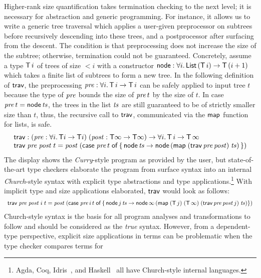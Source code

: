 \documentclass[acmsmall%
]{acmart}\settopmatter{printfolios=true}
\begin{document}
Higher-rank size quantification takes termination checking to the next
level; it is necessary for abstraction and generic programming.  For
instance, it allows us to write a generic tree traversal which applies
a user-given preprocessor on subtrees before recursively descending
into these trees, and a postprocessor after surfacing from the
descent.
The condition is that preprocessing does not increase the size of the subtree; otherwise, termination could not be guaranteed.  Concretely, assume a type $\mathsf{T}\,i$ of trees of size $< i$ with a constructor $\mathsf{node} : \forall i.\, \mathsf{List}\,(\mathsf{T}\,i) \to \mathsf{T}\,(i+1)$ which takes a finite list of subtrees to form a new tree.
In the following definition of $\mathsf{trav}$, the preprocessing $\mathit{pre} : \forall i.\, \mathsf{T}\,i \to \mathsf{T}\,i$ can be safely applied to input tree $t$ because the type of $\mathit{pre}$ bounds the size of $\mathit{pre}\,t$ by the size of $t$.
In case $\mathit{pre}\,t = \mathsf{node}\,\mathit{ts}$, the trees in the list $\mathit{ts}$ are still guaranteed to be of strictly smaller size than $t$, thus, the recursive call to $\mathsf{trav}$, communicated via the $\mathsf{map}$ function for lists, is safe.
\[
\begin{array}{l}
  \mathsf{trav} : (\mathit{pre} : \forall i.\, \mathsf{T} i \to \mathsf{T} i)\; (\mathit{post} : \mathsf{T} \infty \to \mathsf{T} \infty) \to \forall i.\, \mathsf{T}\,i \to \mathsf{T}\,\infty
  \\
  \mathsf{trav} \; \mathit{pre} \; \mathit{post} \; t = \mathit{post}\;(\mathsf{case}\;\mathit{pre}\,t\;\mathsf{of} \, \{ \, \mathsf{node}\,\mathit{ts} \to \mathsf{node}\,(\mathsf{map} \; (\mathsf{trav} \, \mathit{pre} \, \mathit{post}) \; \mathit{ts})\, \})
\end{array}
\]
The display shows the \emph{Curry}-style program as provided by the user, but state-of-the-art type checkers elaborate the program from surface syntax into an internal \emph{Church}-style syntax with explicit type abstractions and type applications.\footnote{Agda, Coq, Idris~\cite{brady:jfp13}, and Haskell~\cite{sulzmannChakravartyPeythonJonesDonnelly:tldi07} all have Church-style internal languages.}  With implicit type and size applications elaborated, $\mathsf{trav}$ would look as follows:
\[
\begin{array}{l}
  \mathsf{trav} \; \mathit{pre} \; \mathit{post} \; i\; t = \mathit{post}\;(\mathsf{case}\;\mathit{pre}\,i\,t\;\mathsf{of} \, \{ \, \mathsf{node}\,j\,\mathit{ts} \to \mathsf{node}\,\infty\,(\mathsf{map} \; (\mathsf{T}\,j) \; (\mathsf{T}\,\infty) \; (\mathsf{trav} \, \mathit{pre} \, \mathit{post} \, j) \; \mathit{ts}) \})
\end{array}
\]
Church-style syntax is the basis for all program analyses and transformations to follow and should be considered as the \emph{true} syntax.
However, from a dependent-type perspective, explicit size applications
in terms can be problematic when the type checker compares terms for
\end{document}
